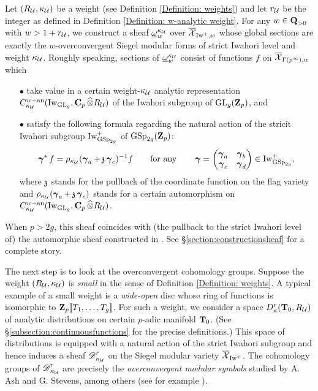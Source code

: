 Let $(R_{\operatorname{\mathcal{U}}}, \kappa_{\operatorname{\mathcal{U}}})$ be a weight (see Definition \ref{Definition: weights}) and let $r_{\operatorname{\mathcal{U}}}$ be the integer as defined in Definition \ref{Definition: w-analytic weight}. For any $w\in \operatorname{\mathbf{Q}}_{>0}$ with $w>1+r_{\operatorname{\mathcal{U}}}$, we construct a sheaf $\underline{\omega}_w^{\kappa_{\operatorname{\mathcal{U}}}}$ over $\overline{\operatorname{\mathcal{X}}}_{\operatorname{Iw}^+, w}$ whose global sections are exactly the $w$-overconvergent Siegel modular forms of strict Iwahori level and weight $\kappa_{\operatorname{\mathcal{U}}}$. Roughly speaking, sections of $\underline{\omega}_w^{\kappa_{\operatorname{\mathcal{U}}}}$ consist of functions $f$ on $\overline{\operatorname{\mathcal{X}}}_{\Gamma(p^{\infty}),w}$ which 
\begin{enumerate}
    \item[$\bullet$] take value in a certain weight-$\kappa_{\operatorname{\mathcal{U}}}$ analytic representation $C_{\kappa_{\operatorname{\mathcal{U}}}}^{w-\operatorname{an}}(\operatorname{Iw}_{\operatorname{GL}_g}, \operatorname{\mathbf{C}}_p\widehat{\otimes}R_{\operatorname{\mathcal{U}}})$ of the Iwahori subgroup of $\operatorname{GL}_g(\operatorname{\mathbf{Z}}_p)$, and
    \item[$\bullet$] satisfy the following formula regarding the natural action of the stricit Iwahori subgroup $\operatorname{Iw}_{\operatorname{GSp}_{2g}}^+$ of $\operatorname{GSp}_{2g}(\operatorname{\mathbf{Z}}_p)$:
    \[
        \operatorname{\boldsymbol{\gamma}}^* f=\rho_{\kappa_{\operatorname{\mathcal{U}}}}(\operatorname{\boldsymbol{\gamma}}_a+\operatorname{\mathfrak{z}}\operatorname{\boldsymbol{\gamma}}_c)^{-1}f\qquad\text{for any} \qquad\operatorname{\boldsymbol{\gamma}}=\begin{pmatrix}\operatorname{\boldsymbol{\gamma}}_a & \operatorname{\boldsymbol{\gamma}}_b\\ \operatorname{\boldsymbol{\gamma}}_c & \operatorname{\boldsymbol{\gamma}}_d\end{pmatrix}\in \operatorname{Iw}^+_{\operatorname{GSp}_{2g}},
    \]
    where $\operatorname{\mathfrak{z}}$ stands for the pullback of the coordinate function on the flag variety and  $\rho_{\kappa_{\operatorname{\mathcal{U}}}}(\operatorname{\boldsymbol{\gamma}}_a+\operatorname{\mathfrak{z}}\operatorname{\boldsymbol{\gamma}}_c)$ stands for a certain automorphism on $C_{\kappa_{\operatorname{\mathcal{U}}}}^{w-\operatorname{an}}(\operatorname{Iw}_{\operatorname{GL}_g}, \operatorname{\mathbf{C}}_p\widehat{\otimes}R_{\operatorname{\mathcal{U}}})$. 
\end{enumerate}
When $p>2g$, this sheaf coincides with (the pullback to the strict Iwahori level of) the automorphic sheaf constructed in \cite{AIP-2015}. See \S \ref{section:constructionsheaf} for a complete story.

The next step is to look at the overconvergent cohomology groups. Suppose the weight $(R_{\operatorname{\mathcal{U}}}, \kappa_{\operatorname{\mathcal{U}}})$ is \emph{small} in the sense of Definition \ref{Definition: weights}. A typical example of a small weight is a \emph{wide-open} disc whose ring of functions is isomorphic to $\operatorname{\mathbf{Z}}_p\operatorname{\![\![\!}  T_1, \ldots, T_g \operatorname{\!]\!]}$. For such a weight, we consider a space $D^r_{\kappa}(\operatorname{\mathbf{T}}_0, R_{\operatorname{\mathcal{U}}})$ of analytic distributions on certain $p$-adic manifold $\operatorname{\mathbf{T}}_0$. (See \S \ref{subsection:continuousfunctions} for the precise definitions.) This space of distributions is equipped with a natural action of the strict Iwahori subgroup and hence induces a sheaf $\operatorname{\mathscr{D}}_{\kappa_{\operatorname{\mathcal{U}}}}^r$ on the Siegel modular variety $\overline{\operatorname{\mathcal{X}}}_{\operatorname{Iw}^+}$. The cohomology groups of $\operatorname{\mathscr{D}}_{\kappa_{\operatorname{\mathcal{U}}}}^r$ are precisely the \emph{overconvergent modular symbols} studied by A. Ash and G. Stevens, among others (see for example \cite{Ash-Stevens, Hansen-PhD, Johansson-Newton}).


